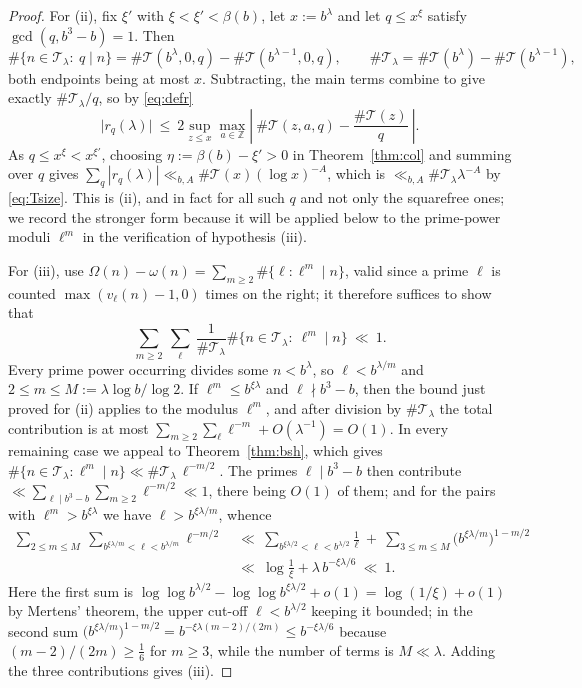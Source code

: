 \documentclass[11pt,a4paper]{article}
\theoremstyle{plain}
\theoremstyle{definition}
\numberwithin{equation}{section}
\begin{document}
\begin{proof}
For (ii), fix $\xi'$ with $\xi<\xi'<\beta(b)$, let $x:=b^{\lambda}$ and let $q\le x^{\xi}$ satisfy
$\gcd(q,b^{3}-b)=1$. Then
\[
\#\bigl\{n\in\mathcal T_\lambda:\ q\mid n\bigr\}=\#\mathcal T(b^{\lambda},0,q)-\#\mathcal T(b^{\lambda-1},0,q),
\qquad
\#\mathcal T_\lambda=\#\mathcal T(b^{\lambda})-\#\mathcal T(b^{\lambda-1}),
\]
both endpoints being at most $x$. Subtracting, the main terms combine to give exactly
$\#\mathcal T_\lambda/q$, so by \eqref{eq:defr}
\[
\bigl|r_q(\lambda)\bigr|\ \le\ 2\sup_{z\le x}\max_{a\in\mathbb Z}
\left|\ \#\mathcal T(z,a,q)-\frac{\#\mathcal T(z)}{q}\ \right| .
\]
As $q\le x^{\xi}<x^{\xi'}$, choosing $\eta:=\beta(b)-\xi'>0$ in Theorem~\ref{thm:col} and summing over $q$
gives $\sum_{q}|r_q(\lambda)|\ll_{b,A}\#\mathcal T(x)(\log x)^{-A}$, which is
$\ll_{b,A}\#\mathcal T_\lambda\lambda^{-A}$ by \eqref{eq:Tsize}. This is (ii), and in fact for all such
$q$ and not only the squarefree ones; we record the stronger form because it will be applied below to
the prime-power moduli $\ell^{m}$ in the verification of hypothesis (iii).

For (iii), use $\Omega(n)-\omega(n)=\sum_{m\ge2}\#\{\ell:\ell^{m}\mid n\}$, valid since a prime $\ell$ is
counted $\max(v_\ell(n)-1,0)$ times on the right; it therefore suffices to show that
\[
\sum_{m\ge2}\ \sum_{\ell}\ \frac{1}{\#\mathcal T_\lambda}
\#\bigl\{n\in\mathcal T_\lambda:\ \ell^{m}\mid n\bigr\}\ \ll\ 1 .
\]
Every prime power occurring divides some $n<b^{\lambda}$,
so $\ell<b^{\lambda/m}$ and $2\le m\le M:=\lambda\log b/\log2$. If $\ell^{m}\le b^{\xi\lambda}$ and
$\ell\nmid b^{3}-b$, then the bound just proved for (ii) applies to the modulus $\ell^{m}$, and after
division by $\#\mathcal T_\lambda$ the total contribution is at
most $\sum_{m\ge2}\sum_{\ell}\ell^{-m}+O(\lambda^{-1})=O(1)$. In every remaining case we appeal to
Theorem~\ref{thm:bsh}, which gives
$\#\{n\in\mathcal T_\lambda:\ell^{m}\mid n\}\ll\#\mathcal T_\lambda\,\ell^{-m/2}$. The primes
$\ell\mid b^{3}-b$ then contribute $\ll\sum_{\ell\mid b^{3}-b}\sum_{m\ge2}\ell^{-m/2}\ll1$, there being
$O(1)$ of them; and for the pairs with $\ell^{m}>b^{\xi\lambda}$ we have $\ell>b^{\xi\lambda/m}$, whence
\[
\begin{aligned}
\sum_{2\le m\le M}\ \sum_{b^{\xi\lambda/m}<\ell<b^{\lambda/m}}\ell^{-m/2}
&\ \ll\ \sum_{b^{\xi\lambda/2}<\ell<b^{\lambda/2}}\frac1\ell
\ +\ \sum_{3\le m\le M}\bigl(b^{\xi\lambda/m}\bigr)^{1-m/2}\\
&\ \ll\ \log\frac1\xi+\lambda\,b^{-\xi\lambda/6}\ \ll\ 1 .
\end{aligned}
\]
Here the first sum is $\log\log b^{\lambda/2}-\log\log b^{\xi\lambda/2}+o(1)=\log(1/\xi)+o(1)$ by Mertens'
theorem, the upper cut-off $\ell<b^{\lambda/2}$ keeping it bounded; in the second sum
$\bigl(b^{\xi\lambda/m}\bigr)^{1-m/2}=b^{-\xi\lambda(m-2)/(2m)}\le b^{-\xi\lambda/6}$ because
$(m-2)/(2m)\ge\frac16$ for $m\ge3$, while the number of terms is $M\ll\lambda$. Adding the three
contributions gives (iii).
\end{proof}
\end{document}
